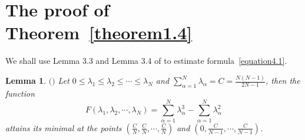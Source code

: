\documentclass{amsart}
\newtheorem{lemma}[theorem]{Lemma}
\theoremstyle{definition}
\theoremstyle{remark}
\numberwithin{equation}{section}
\begin{document}
\section{The proof of Theorem~\ref{theorem1.4}}
We shall use Lemma 3.3 and Lemma 3.4 of \cite{fu2025new} to estimate  formula~\eqref{equation4.1}.
\begin{lemma}$(${\cite{fu2025new}}$)$
\label{lemma5.1}
Let $0 \le {\lambda _1} \le {\lambda _2} \le  \cdots  \le {\lambda _N}$ and $\sum\limits_{\alpha  = 1}^N {{\lambda _\alpha }}  = C = \frac{{N\left( {N - 1} \right)}}{{2N - 1}}$, then the function
$$F\left( {{\lambda _1},{\lambda _2}, \cdots ,{\lambda _N}} \right) = \sum\limits_{\alpha  = 1}^N {\lambda _\alpha ^3}  - \sum\limits_{\alpha  = 1}^N {\lambda _\alpha ^2} $$
attains its minimal at  the points $\left( {\frac{C}{N},\frac{C}{N}, \cdots ,\frac{C}{N}} \right)$ and $\left( {0,\frac{C}{{N - 1}}, \cdots ,\frac{C}{{N - 1}}} \right)$.
\end{lemma}
\end{document}
